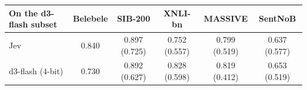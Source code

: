 \begin{tabular}{@{}lccccc@{}}\toprule
On the d3-flash subset & Belebele & SIB-200 & XNLI-bn & MASSIVE & SentNoB \\\midrule
Jev & 0.840 & 0.897 (0.725) & 0.752 (0.557) & 0.799 (0.519) & 0.637 (0.577) \\
d3-flash (4-bit) & 0.730 & 0.892 (0.627) & 0.828 (0.598) & 0.819 (0.412) & 0.653 (0.519) \\
\bottomrule\end{tabular}
